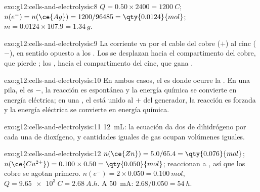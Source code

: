 \begin{solution}{exo:g12:cells-and-electrolysis:8}
$Q = 0.50 \times 2400 = \qty{1200}{C}$; $n(e^-) = n(\ce{Ag}) =
1200/96485 = \qty{0.0124}{mol}$; $m = 0.0124 \times 107.9 =
\qty{1.34}{g}$.
\end{solution}

\begin{solution}{exo:g12:cells-and-electrolysis:9}
La corriente va por el cable del cobre ($+$) al cinc ($-$), en sentido
opuesto a los . Los   se desplazan hacia el
compartimento del cobre, que pierde ; los  ,
hacia el compartimento del cinc, que gana .
\end{solution}

\begin{solution}{exo:g12:cells-and-electrolysis:10}
En ambos casos, el  es donde ocurre la . En una pila, el
 es $-$, la reacción es espontánea y la energía química se
convierte en energía eléctrica; en una , el  está unido
al $+$ del generador, la reacción es forzada y la energía eléctrica se
convierte en energía química.
\end{solution}

\begin{solution}{exo:g12:cells-and-electrolysis:11}
\qty{12}{mL}: la ecuación  da dos  de
dihidrógeno por cada una de dioxígeno, y cantidades iguales de gas
ocupan volúmenes iguales.
\end{solution}

\begin{solution}{exo:g12:cells-and-electrolysis:12}
$n(\ce{Zn}) = 5.0/65.4 = \qty{0.076}{mol}$;
$n(\ce{Cu^{2+}}) = 0.100 \times 0.50 = \qty{0.050}{mol}$; reaccionan
 a , así que los  cobre se agotan primero.
$n(e^-) = 2 \times 0.050
= \qty{0.100}{mol}$, $Q = \qty{9.65e3}{C} = \qty{2.68}{A.h}$. A \qty{50}{mA}: $2.68/0.050 = \qty{54}{h}$.
\end{solution}

